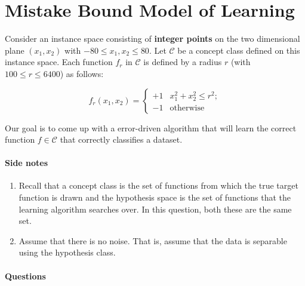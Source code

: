 \section{Mistake Bound Model of Learning}

Consider an instance space consisting of {\bf integer points} on the
two dimensional plane $(x_1, x_2)$ with $-80 \leq x_1, x_2 \leq 80$.
Let $\mathcal C$ be a concept class defined on this instance space.
Each function $f_r$ in $\mathcal C$ is defined by a radius $r$ (with
$100 \leq r \leq 6400$) as follows:

\begin{equation}
f_r(x_1, x_2) = \left\{
    \begin{array}{rl}
      +1 & x_1^2 + x_2^2 \leq r^2;\\
      -1 & \mbox{otherwise}
    \end{array}
\right.
\label{eq:f_r}
\end{equation}


Our goal is to come up with a error-driven algorithm that will learn
the correct function $f \in \mathcal{C}$ that correctly classifies a
dataset.

\paragraph{Side notes}
\begin{enumerate}
\item Recall that a concept class is the set of functions from which
  the true target function is drawn and the hypothesis space is the
  set of functions that the learning algorithm searches over. In this
  question, both these are the same set.
\item Assume that there is no noise. That is, assume that the data is
  separable using the hypothesis class.
\end{enumerate}


\paragraph{Questions}


